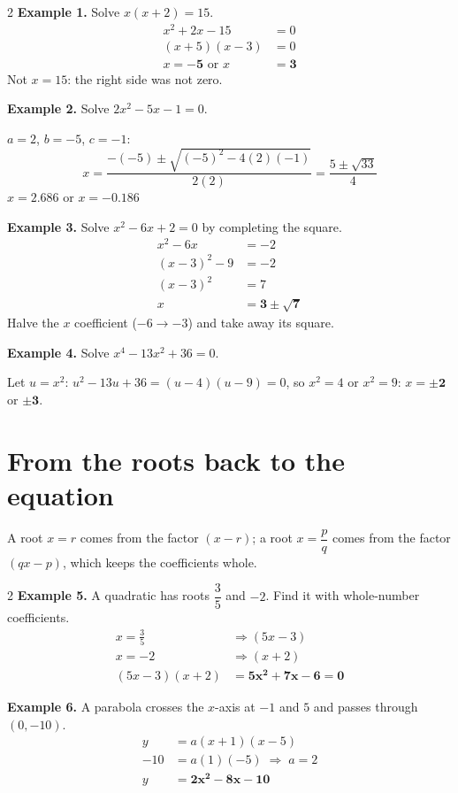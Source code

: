 \documentclass[11pt]{article}
\begin{document}
\begin{multicols}{2}
\textbf{Example 1.} Solve $x(x+2) = 15$.
\begin{align*}
x^{2} + 2x - 15 &= 0\\
(x+5)(x-3) &= 0\\
x = \mathbf{-5} \text{ or } x &= \mathbf{3}
\end{align*}
Not $x = 15$: the right side was not zero.

\textbf{Example 2.} Solve $2x^{2} - 5x - 1 = 0$.\par
$a = 2$, $b = -5$, $c = -1$:
\[ x = \frac{-(-5) \pm \sqrt{(-5)^{2} - 4(2)(-1)}}{2(2)} = \frac{5 \pm \sqrt{33}}{4} \]
$x = \mathbf{2.686}$ or $x = \mathbf{-0.186}$ 
\columnbreak

\textbf{Example 3.} Solve $x^{2} - 6x + 2 = 0$ by completing the square.
\begin{align*}
x^{2} - 6x &= -2\\
(x - 3)^{2} - 9 &= -2\\
(x - 3)^{2} &= 7\\
x &= \mathbf{3 \pm \sqrt{7}}
\end{align*}
Halve the $x$ coefficient ($-6 \to -3$) and take away its square.

\textbf{Example 4.} Solve $x^{4} - 13x^{2} + 36 = 0$.\par
Let $u = x^{2}$: $u^{2} - 13u + 36 = (u-4)(u-9) = 0$, so $x^{2} = 4$ or $x^{2} = 9$: $x = \mathbf{\pm 2}$ or $\mathbf{\pm 3}$. 
\end{multicols}

\section{From the roots back to the equation}\label{h3:roots}
A root $x = r$ comes from the factor $(x - r)$; a root $x = \dfrac{p}{q}$ comes from the factor $(qx - p)$, which keeps the coefficients whole.
\begin{multicols}{2}
\textbf{Example 5.} A quadratic has roots $\dfrac{3}{5}$ and $-2$. Find it with whole-number coefficients.
\begin{align*}
x = \tfrac{3}{5} &\Rightarrow (5x - 3)\\
x = -2 &\Rightarrow (x + 2)\\
(5x-3)(x+2) &= \mathbf{5x^{2} + 7x - 6 = 0}
\end{align*}
\columnbreak

\textbf{Example 6.} A parabola crosses the $x$-axis at $-1$ and $5$ and passes through $(0, -10)$.
\begin{align*}
y &= a(x+1)(x-5)\\
-10 &= a(1)(-5) \;\Rightarrow\; a = 2\\
y &= \mathbf{2x^{2} - 8x - 10}
\end{align*}
\end{multicols}
\end{document}
